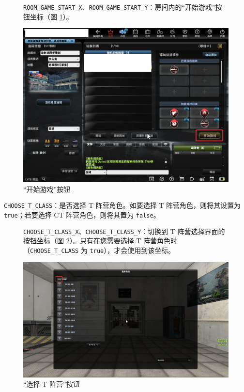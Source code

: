 \begin{figure}[H]
    \Centering
    \parbox[l]{\textwidth}{\lstinline{ROOM_GAME_START_X}、\lstinline{ROOM_GAME_START_Y}：房间内的“开始游戏”按钮坐标（图 \ref{ch2fig-start-game}）。}
    \includegraphics[width=\textwidth]{docs/assets/start_game.png}
    \caption{“开始游戏”按钮}
    \label{ch2fig-start-game}
\end{figure}

\lstinline{CHOOSE_T_CLASS}：是否选择 T 阵营角色。如要选择 T 阵营角色，则将其设置为 \lstinline{true}；若要选择 CT 阵营角色，则将其置为 \lstinline{false}。

\begin{figure}[H]
    \Centering
    \parbox[l]{\textwidth}{\lstinline{CHOOSE_T_CLASS_X}、\lstinline{CHOOSE_T_CLASS_Y}：切换到 T 阵营选择界面的按钮坐标（图 \ref{ch2fig-choose-t-class}）。只有在您需要选择 T 阵营角色时（\lstinline{CHOOSE_T_CLASS} 为 \lstinline{true}），才会使用到该坐标。}
    \includegraphics[width=\textwidth]{docs/assets/choose_T_class.png}
    \caption{“选择 T 阵营”按钮}
    \label{ch2fig-choose-t-class}
\end{figure}

